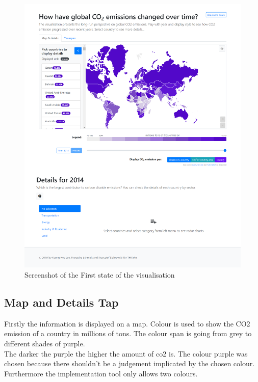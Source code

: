 \documentclass[a4paper]{article}
\begin{document}
\begin{figure}[h!]
\includegraphics[width=1.0 \textwidth]{screencapture-glanonim-Archive-visualization-2020-01-12-17_46_35.png} 
\caption{Screenshot of the First state of the visualisation}
\end{figure}
\subsection{Map and Details Tap} 
Firstly the information is displayed on a map. Colour is used to show the CO2 emission of a country in millions of tons. The colour span is going from grey to different shades of purple. 
\\ The darker the purple the higher the amount of co2 is. The colour purple was chosen because there shouldn't be a judgement implicated by the chosen colour. Furthermore the implementation tool only allows two colours. \\
\end{document}
